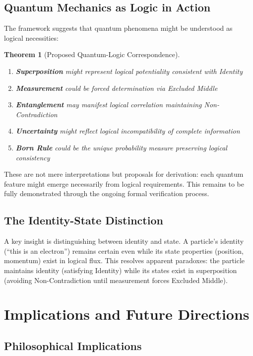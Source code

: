 \documentclass[12pt,a4paper]{article}
\newtheorem{theorem}{Theorem}
\begin{document}
\subsection{Quantum Mechanics as Logic in Action}

The framework suggests that quantum phenomena might be understood as logical necessities:

\begin{theorem}[Proposed Quantum-Logic Correspondence]
~\\
\begin{enumerate}
\item \textbf{Superposition} might represent logical potentiality consistent with Identity
\item \textbf{Measurement} could be forced determination via Excluded Middle
\item \textbf{Entanglement} may manifest logical correlation maintaining Non-Contradiction
\item \textbf{Uncertainty} might reflect logical incompatibility of complete information
\item \textbf{Born Rule} could be the unique probability measure preserving logical consistency
\end{enumerate}
\end{theorem}

These are not mere interpretations but proposals for derivation: each quantum feature might emerge necessarily from logical requirements. This remains to be fully demonstrated through the ongoing formal verification process.

\subsection{The Identity-State Distinction}

A key insight is distinguishing between identity and state. A particle's identity (``this is an electron'') remains certain even while its state properties (position, momentum) exist in logical flux. This resolves apparent paradoxes: the particle maintains identity (satisfying Identity) while its states exist in superposition (avoiding Non-Contradiction until measurement forces Excluded Middle).

\section{Implications and Future Directions}

\subsection{Philosophical Implications}
\end{document}
